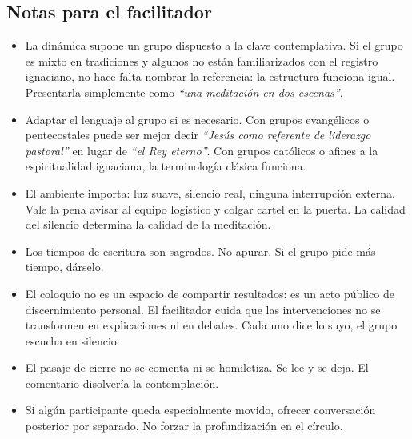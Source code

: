 \documentclass[11pt, a4paper]{article}
\begin{document}
\begin{actividad}
\subsection*{Notas para el facilitador}
\begin{itemize}
  \item La dinámica supone un grupo dispuesto a la clave contemplativa. Si el grupo es mixto en tradiciones y algunos no están familiarizados con el registro ignaciano, no hace falta nombrar la referencia: la estructura funciona igual. Presentarla simplemente como \emph{``una meditación en dos escenas''}.
  \item Adaptar el lenguaje al grupo si es necesario. Con grupos evangélicos o pentecostales puede ser mejor decir \emph{``Jesús como referente de liderazgo pastoral''} en lugar de \emph{``el Rey eterno''}. Con grupos católicos o afines a la espiritualidad ignaciana, la terminología clásica funciona.
  \item El ambiente importa: luz suave, silencio real, ninguna interrupción externa. Vale la pena avisar al equipo logístico y colgar cartel en la puerta. La calidad del silencio determina la calidad de la meditación.
  \item Los tiempos de escritura son sagrados. No apurar. Si el grupo pide más tiempo, dárselo.
  \item El coloquio no es un espacio de compartir resultados: es un acto público de discernimiento personal. El facilitador cuida que las intervenciones no se transformen en explicaciones ni en debates. Cada uno dice lo suyo, el grupo escucha en silencio.
  \item El pasaje de cierre no se comenta ni se homiletiza. Se lee y se deja. El comentario disolvería la contemplación.
  \item Si algún participante queda especialmente movido, ofrecer conversación posterior por separado. No forzar la profundización en el círculo.
\end{itemize}

\end{actividad}

\newpage
\end{document}
